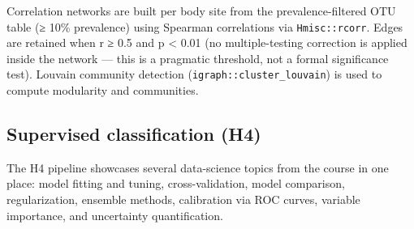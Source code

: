 \documentclass[
  letterpaper,
  DIV=11,
  numbers=noendperiod]{scrartcl}
\begin{document}
Correlation networks are built per body site from the
prevalence-filtered OTU table (≥ 10\% prevalence) using Spearman
correlations via \texttt{Hmisc::rcorr}. Edges are retained when
\textbar r\textbar{} ≥ 0.5 and p \textless{} 0.01 (no multiple-testing
correction is applied inside the network --- this is a pragmatic
threshold, not a formal significance test). Louvain community detection
(\texttt{igraph::cluster\_louvain}) is used to compute modularity and
communities.

\subsection{Supervised classification
(H4)}\label{supervised-classification-h4}

The H4 pipeline showcases several data-science topics from the course in
one place: model fitting and tuning, cross-validation, model comparison,
regularization, ensemble methods, calibration via ROC curves, variable
importance, and uncertainty quantification.
\end{document}
